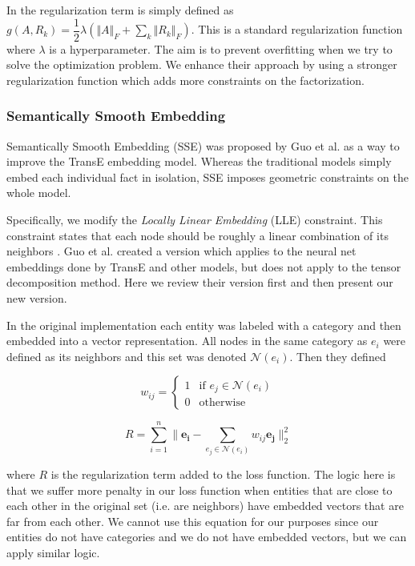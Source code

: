 \documentclass[pageno]{jpaper}
\begin{document}
In \cite{Nickel2011}\cite{Chang2014} the regularization term is simply defined
as $g(A, R_k) = \dfrac{1}{2}\lambda (\Vert A \Vert_F + \sum_k \Vert R_k
\Vert_F)$. This is a standard regularization function where $\lambda$ is a
hyperparameter. The aim is to prevent overfitting when we try to solve the
optimization problem. We enhance their approach by using a stronger
regularization function which adds more constraints on the factorization. \\

\subsubsection{Semantically Smooth Embedding}
\label{Semantically Smooth Embedding}

Semantically Smooth Embedding (SSE) was proposed by Guo et al. \cite{Guo2015} as
a way to improve the TransE \cite{Bordes2013} embedding model. Whereas the
traditional models simply embed each individual fact in isolation, SSE imposes
geometric constraints on the whole model.

Specifically, we modify the \textit{Locally Linear Embedding} (LLE) constraint.
This constraint states that each node should be roughly a linear combination of
its neighbors \cite{Roweis2000}. Guo et al. created a version which applies to
the neural net embeddings done by TransE and other models, but does not apply to
the tensor decomposition method. Here we review their version first and then
present our new version.

In the original implementation each entity was labeled with a category and
then embedded into a vector representation. All nodes in the same category as
$e_i$ were defined as its neighbors and this set was denoted $\mathcal{N}(e_i)$.
Then they defined

$$
w_{ij} =
\begin{cases}
    1 & \text{if } e_j \in \mathcal{N}(e_i) \\
    0 & \text{otherwise}
\end{cases}
$$

$$R = \sum_{i=1}^n \lVert \mathbf{e_i} - \sum_{e_j \in \mathcal{N}(e_i)} w_{ij}
\mathbf{e_j} \rVert_2^2$$

where $R$ is the regularization term added to the loss function. The logic here
is that we suffer more penalty in our loss function when entities that are close
to each other in the original set (i.e. are neighbors) have embedded vectors
that are far from each other. We cannot use this equation for our purposes since
our entities do not have categories and we do not have embedded vectors, but we
can apply similar logic.
\end{document}
